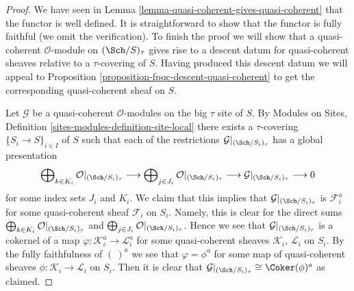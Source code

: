 \begin{proof}
We have seen in Lemma \ref{lemma-quasi-coherent-gives-quasi-coherent}
that the functor is well defined.
It is straightforward to show that the functor is fully faithful (we omit
the verification). To finish the proof we will show that a
quasi-coherent $\mathcal{O}$-module on $(\Sch/S)_\tau$ gives
rise to a descent datum for quasi-coherent sheaves relative to a
$\tau$-covering of $S$. Having produced this descent datum we will appeal
to Proposition \ref{proposition-fpqc-descent-quasi-coherent} to get the
corresponding quasi-coherent sheaf on $S$.

\medskip\noindent
Let $\mathcal{G}$ be a quasi-coherent $\mathcal{O}$-modules on
the big $\tau$ site of $S$. By
Modules on Sites, Definition \ref{sites-modules-definition-site-local}
there exists a $\tau$-covering $\{S_i \to S\}_{i \in I}$ of $S$
such that each of the restrictions
$\mathcal{G}|_{(\Sch/S_i)_\tau}$ has a global presentation
$$
\bigoplus\nolimits_{k \in K_i} \mathcal{O}|_{(\Sch/S_i)_\tau}
\longrightarrow
\bigoplus\nolimits_{j \in J_i} \mathcal{O}|_{(\Sch/S_i)_\tau}
\longrightarrow
\mathcal{G}|_{(\Sch/S_i)_\tau} \longrightarrow 0
$$
for some index sets $J_i$ and $K_i$. We claim that this implies
that $\mathcal{G}|_{(\Sch/S_i)_\tau}$ is $\mathcal{F}_i^a$
for some quasi-coherent sheaf $\mathcal{F}_i$ on $S_i$. Namely,
this is clear for the direct sums
$\bigoplus\nolimits_{k \in K_i} \mathcal{O}|_{(\Sch/S_i)_\tau}$
and
$\bigoplus\nolimits_{j \in J_i} \mathcal{O}|_{(\Sch/S_i)_\tau}$.
Hence we see that $\mathcal{G}|_{(\Sch/S_i)_\tau}$ is a
cokernel of a map $\varphi : \mathcal{K}_i^a \to \mathcal{L}_i^a$
for some quasi-coherent sheaves $\mathcal{K}_i$, $\mathcal{L}_i$
on $S_i$. By the fully faithfulness of $(\ )^a$ we see that
$\varphi = \phi^a$ for some map of quasi-coherent sheaves
$\phi : \mathcal{K}_i \to \mathcal{L}_i$ on $S_i$. Then it is
clear that
$\mathcal{G}|_{(\Sch/S_i)_\tau} \cong \Coker(\phi)^a$
as claimed.


\end{proof}
